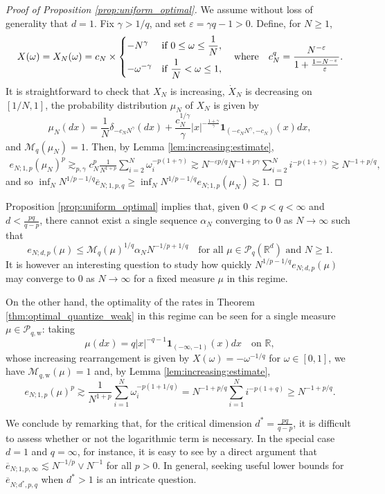 \documentclass[11pt,reqno]{amsart}
\theoremstyle{definition}
\newcommand{\weak}{{\mathrm{w}}}
\newcommand{\Rd}{{\mathbb{R}^d}}
\newcommand{\RR}{{\mathbb R}}
\newcommand{\eps}{\varepsilon}
\newcommand{\ind}{\mathbf{1}}
\newcommand{\oline}[1]{\overline{#1}}
\newcommand{\mcl}{\mathcal}
\theoremstyle{definition}
\numberwithin{equation}{section}
\numberwithin{lemma}{section}
\numberwithin{proposition}{section}
\numberwithin{theorem}{section}
\numberwithin{corollary}{section}
\numberwithin{definition}{section}
\numberwithin{remark}{section}
\begin{document}
\begin{proof}[Proof of Proposition \ref{prop:uniform_optimal}]
	We assume without loss of generality that $d = 1$. Fix $\gamma > 1/q$, and set $\eps = \gamma q  - 1 > 0$. Define, for $N \ge 1$,
\[
	X(\omega) = X_N(\omega) = c_N \times
	\begin{dcases}
		- N^\gamma & \text{if } 0 \le \omega \le \frac{1}{N}, \\
		- \omega^{-\gamma} & \text{if } \frac{1}{N} < \omega \le 1,
	\end{dcases}
	\quad \text{where} \quad
	c_N^q =  \frac{ N^{-\eps} }{1 + \frac{1 - N^{-\eps}}{\eps} }.
\]
It is straightforward to check that $X_N$ is increasing, $\dot X_N$ is decreasing on $[1/N, 1]$, the probability distribution $\mu_N$ of $X_N$ is given by
\[
	\mu_N(dx) = \frac{1}{N} \delta_{-c_N N^\gamma}(dx) + \frac{c_N^{1/\gamma}}{\gamma} |x|^{- \frac{1+\gamma}{\gamma}} \ind_{(-c_N N^\gamma, -c_N)}(x) dx,
\]
and $\mcl M_q(\mu_N) = 1$. Then, by Lemma \ref{lem:increasing:estimate},
\begin{align*}
	e_{N;1,p}(\mu_N)^p \gtrsim_{p,\gamma} c_N^p \frac{1}{N^{1+p}} \sum_{i=2}^N \omega_i^{-p(1+\gamma)}
	\gtrsim N^{-\eps p/q} N^{-1 + p \gamma} \sum_{i=2}^N i^{-p(1+\gamma)} \gtrsim N^{-1 + p/q},
\end{align*}
and so $\inf_N N^{1/p - 1/q} \oline e_{N;1,p,q} \ge \inf_N N^{1/p - 1/q} e_{N;1,p}(\mu_N) \gtrsim 1$.
\end{proof}

Proposition \ref{prop:uniform_optimal} implies that, given $0 < p < q < \infty$ and $d < \frac{pq}{q-p}$, there cannot exist a single sequence $\alpha_N$ converging to $0$ as $N \to \infty$ such that
\[
	e_{N;d,p}(\mu) \le \mcl M_q(\mu)^{1/q} \alpha_N N^{-1/p + 1/q} \quad \text{for all } \mu \in \mcl P_q(\Rd) \text{ and } N \ge 1.
\]
It is however an interesting question to study how quickly $N^{1/p - 1/q} e_{N;d,p}(\mu)$ may converge to $0$ as $N \to \infty$ for a fixed measure $\mu$ in this regime.

On the other hand, the optimality of the rates in Theorem \ref{thm:optimal_quantize_weak} in this regime can be seen for a single measure $\mu \in \mcl P_{q,\weak}$: taking
\[
	\mu(dx) = q|x|^{-q - 1} \ind_{(-\infty, -1)}(x) dx \quad \text{on } \RR,
\]
whose increasing rearrangement is given by $X(\omega) = -\omega^{-1/q}$ for $\omega \in [0,1]$, we have $\mcl M_{q,\mathrm w}(\mu) = 1$ and, by Lemma \ref{lem:increasing:estimate},
\[
	e_{N;1,p}(\mu)^p \gtrsim \frac{1}{N^{1+p}} \sum_{i=1}^N \omega_i^{-p(1+1/q)} = N^{-1 + p/q} \sum_{i=1}^N i^{-p(1+q)} \ge N^{-1 + p/q}.
\]

We conclude by remarking that, for the critical dimension $d^* = \frac{pq}{q-p}$, it is difficult to assess whether or not the logarithmic term is necessary. In the special case $d = 1$ and $q = \infty$, for instance, it is easy to see by a direct argument that $\oline e_{N;1,p,\infty} \lesssim N^{-1/p} \vee N^{-1}$ for all $p > 0$. In general, seeking useful lower bounds for $\oline e_{N;d^*,p,q}$ when $d^* > 1$ is an intricate question.











\end{document}
